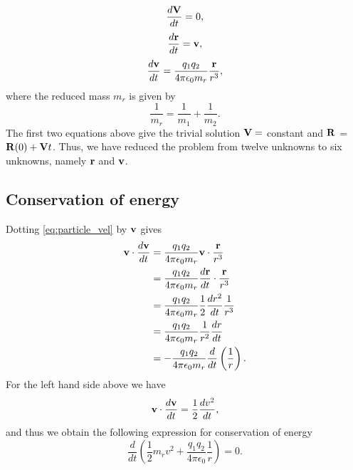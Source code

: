 \documentclass[a4paper,11pt]{report}
\begin{document}
\begin{equation}
    \frac{d \mathbf{V}}{dt} = 0 ,
\end{equation}
\begin{equation}
    \label{eq:particle_pos}
    \frac{d \mathbf{r}}{dt} = \mathbf{v},
\end{equation}
\begin{equation}
    \label{eq:particle_vel}
    \frac{d \mathbf{v}}{dt} = \frac{q_1 q_2}{4\pi \epsilon_0 m_r} \frac{\mathbf{r}}{r^3},
\end{equation}
where the reduced mass $m_r$ is given by
\begin{equation}
    \frac{1}{m_r} = \frac{1}{m_1} + \frac{1}{m_2}.
\end{equation}
The first two equations above give the trivial solution $\mathbf{V} = $ constant and $\mathbf{R}$ = $\mathbf{R}(0) + \mathbf{V} t$. Thus, we have reduced the problem from twelve unknowns to six unknowns, namely $\mathbf{r}$ and $\mathbf{v}$.

\subsection{Conservation of energy}
Dotting \cref{eq:particle_vel} by $\mathbf{v}$ gives 
\begin{align}
    \mathbf{v} \cdot \frac{d \mathbf{v}}{dt} &= \frac{q_1 q_2}{4 \pi \epsilon_0 m_r} \mathbf{v} \cdot \frac{\mathbf{r}}{r^3} \nonumber \\
    &= \frac{q_1 q_2}{4 \pi \epsilon_0 m_r} \frac{d\mathbf{r}}{dt} \cdot \frac{\mathbf{r}}{r^3} \nonumber \\
    &= \frac{q_1 q_2}{4 \pi \epsilon_0 m_r} \frac{1}{2} \frac{dr^2}{dt} \frac{1}{r^3} \nonumber \\
    &= \frac{q_1 q_2}{4 \pi \epsilon_0 m_r} \frac{1}{r^2} \frac{dr}{dt} \nonumber \\
    &= -\frac{q_1 q_2}{4 \pi \epsilon_0 m_r} \frac{d}{dt} \left ( \frac{1}{r} \right ).
\end{align} 
For the left hand side above we have
\begin{equation}
    \mathbf{v} \cdot \frac{d \mathbf{v}}{dt} = \frac{1}{2} \frac{d v^2}{dt},
\end{equation}
and thus we obtain the following expression for conservation of energy
\begin{equation}
    \frac{d}{dt} \left ( \frac{1}{2} m_r v^2 + \frac{q_1 q_2}{4 \pi \epsilon_0} \frac{1}{r} \right ) = 0.
\end{equation}
\end{document}
